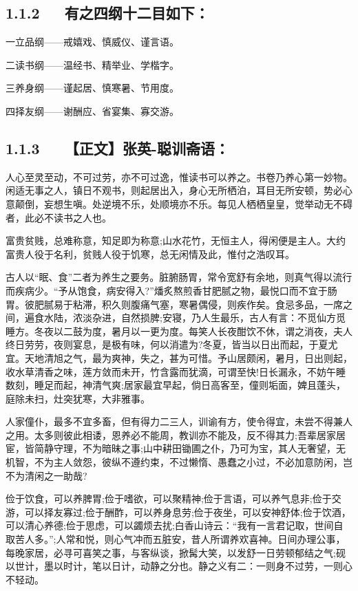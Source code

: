 \documentclass[letterpaper,12pt,english]{sphinxmanual}
\begin{document}
\subsection{1.1.2   有之四纲十二目如下：}
\label{\detokenize{p00_u5176_u5b83/_u300a_u5f20_u82f1-_u806a_u8bad_u658b_u8bed_u300b_u300a_u5f20_u5ef7_u7389-_u6f84_u6000_u56ed_u8bed_u300b_u5408_u8f91:id5}}
一立品纲——戒嬉戏、慎威仪、谨言语。

二读书纲——温经书、精举业、学楷字。

三养身纲——谨起居、慎寒暑、节用度。

四择友纲——谢酬应、省宴集、寡交游。


\subsection{1.1.3   【正文】张英-聪训斋语：}
\label{\detokenize{p00_u5176_u5b83/_u300a_u5f20_u82f1-_u806a_u8bad_u658b_u8bed_u300b_u300a_u5f20_u5ef7_u7389-_u6f84_u6000_u56ed_u8bed_u300b_u5408_u8f91:id6}}
人心至灵至动，不可过劳，亦不可过逸，惟读书可以养之。书卷乃养心第一妙物。闲适无事之人，镇日不观书，则起居出入，身心无所栖泊，耳目无所安顿，势必心意颠倒，妄想生嗔。处逆境不乐，处顺境亦不乐。每见人栖栖皇皇，觉举动无不碍者，此必不读书之人也。

富贵贫贱，总难称意，知足即为称意;山水花竹，无恒主人，得闲便是主人。大约富贵人役于名利，贫贱人役于饥寒，总无闲情及此，惟付之浩叹耳。

古人以“眠、食”二者为养生之要务。脏腑肠胃，常令宽舒有余地，则真气得以流行而疾病少。“予从饱食，病安得入?”燔炙熬煎香甘肥腻之物，最悦口而不宜于肠胃。彼肥腻易于粘滞，积久则腹痛气塞，寒暑偶侵，则疾作矣。食忌多品，一席之间，遍食水陆，浓淡杂进，自然损脾;安寝，乃人生最乐，古人有言：不觅仙方觅睡方。冬夜以二鼓为度，暑月以一更为度。每笑人长夜酣饮不休，谓之消夜，夫人终日劳劳，夜则宴息，是极有味，何以消遣为?冬夏，皆当以日出而起，于夏尤宜。天地清旭之气，最为爽神，失之，甚为可惜。予山居颇闲，暑月，日出则起，收水草清香之味，莲方敛而未开，竹含露而犹滴，可谓至快!日长漏永，不妨午睡数刻，睡足而起，神清气爽;居家最宜早起，倘日高客至，僮则垢面，婢且蓬头，庭除未扫，灶突犹寒，大非雅事。

人家僮仆，最多不宜多畜，但有得力二三人，训谕有方，使令得宜，未尝不得兼人之用。太多则彼此相诿，恩养必不能周，教训亦不能及，反不得其力;吾辈居家居宦，皆简静守理，不为暗昧之事;山中耕田锄圃之仆，乃可为宝，其人无奢望，无机智，不为主人敛怨，彼纵不遵约束，不过懒惰、愚蠢之小过，不必加意防闲，岂不为清闲之一助哉?

俭于饮食，可以养脾胃;俭于嗜欲，可以聚精神;俭于言语，可以养气息非;俭于交游，可以择友寡过;俭于酬酢，可以养身息劳;俭于夜坐，可以安神舒体;俭于饮酒，可以清心养德;俭于思虑，可以蠲烦去扰;白香山诗云：“我有一言君记取，世间自取苦人多。”;人常和悦，则心气冲而五脏安，昔人所谓养欢喜神。日间办理公事，每晚家居，必寻可喜笑之事，与客纵谈，掀髯大笑，以发舒一日劳顿郁结之气;砚以世计，墨以时计，笔以日计，动静之分也。静之义有二：一则身不过劳，一则心不轻动。
\end{document}

